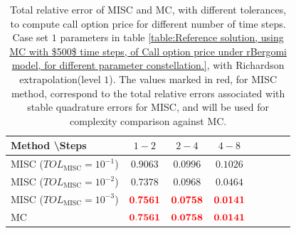 \begin{table}[!h]
	\centering
	\begin{tabular}{l*{6}{c}r}
		Method \textbackslash  Steps            & $1-2$ & $2-4$ & $4-8$   \\
		\hline
		MISC ($TOL_{\text{MISC}}=10^{-1}$)  & $\mathbf{0.9063
		}$ & $\mathbf{ 0.0996}$ & $\mathbf{  0.1026}$   \\
		MISC ($TOL_{\text{MISC}}=10^{-2}$)  & $\mathbf{0.7378}$ & $\mathbf{  0.0968}$ & $\mathbf{   0.0464}$  \\	
		MISC ($TOL_{\text{MISC}}=10^{-3}$)  & $\mathbf{{\color{red}0.7561}}$ & $\mathbf{{\color{red}0.0758}}$ & $\mathbf{{\color{red}0.0141}}$  \\
		\hline
		MC   & $\mathbf{{\color{red}0.7561}}$  & $\mathbf{{\color{red}0.0758}}$  & $\mathbf{{\color{red}0.0141}}$  \\
		
		\hline
	\end{tabular}
	\caption{Total  relative error of MISC and MC, with different tolerances, to compute call option price for different number of time steps. Case set $1$ parameters in table \ref{table:Reference solution, using MC with $500$ time steps, of Call option price under rBergomi model, for different parameter constellation.}, with Richardson extrapolation(level $1$). The values marked in red, for MISC method, correspond to the total relative errors associated with  stable quadrature errors for MISC, and will be used for complexity comparison against MC.}
	\label{Total  error of MISC and MC to compute Call option price of the different tolerances for different number of time steps. Case set $1$ parameters, with Richardson extrapolation(level $1$). The numbers between parentheses are the corresponding absolute errors.}
\end{table}
\FloatBarrier
